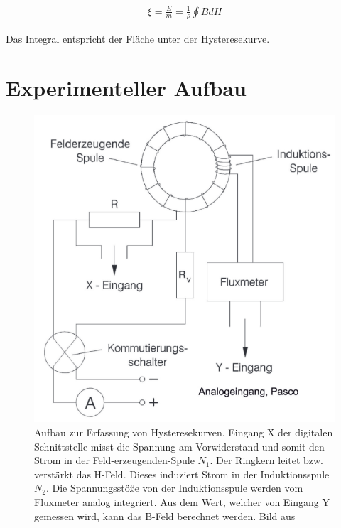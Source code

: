 \documentclass[a4paper,10pt,twocolumn]{article}
\begin{document}
    \begin{align}
        \label{eq:EnergyLoss}
        \xi = \frac{E}{m} = \frac{1}{\rho} \oint{B dH}
    \end{align}
    
    Das Integral entspricht der Fläche unter der Hysteresekurve.
    
    \section{Experimenteller Aufbau}
    
    \begin{figure}[htbp]
        \includegraphics[width=0.9\linewidth]{ExperimentalSetup}
        \caption{Aufbau zur Erfassung von Hysteresekurven.
        Eingang X der digitalen Schnittstelle misst die Spannung am Vorwiderstand und somit den Strom in der Feld-erzeugenden-Spule $N_1$.
        Der Ringkern leitet bzw. verstärkt das H-Feld.
        Dieses induziert Strom in der Induktionsspule $N_2$.
        Die Spannungsstöße von der Induktionsspule werden vom Fluxmeter analog integriert.
        Aus dem Wert, welcher von Eingang Y gemessen wird, kann das B-Feld berechnet werden.
        Bild aus~\cite{experimentManual}}
        \label{fig:ExperimentalSetup}
    \end{figure}
    
\end{document}

